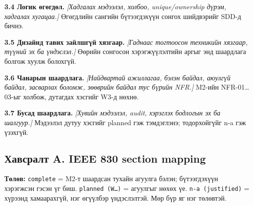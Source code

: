 \textbf{3.4 Логик өгөгдөл.} \emph{{[}Хадгалах мэдээлэл, холбоо,
unique/ownership дүрэм, хадгалах хугацаа.{]}} Өгөгдлийн сангийн
бүтээгдэхүүн сонгох шийдвэрийг SDD-д бичнэ.

\textbf{3.5 Дизайнд тавих зайлшгүй хязгаар.} \emph{{[}Гаднаас тогтоосон
техникийн хязгаар, түүний эх ба үндэслэл.{]}} Өөрийн сонгосон
хэрэгжүүлэлтийн аргыг энд шаардлага болгож хуулж болохгүй.

\textbf{3.6 Чанарын шаардлага.} \emph{{[}Найдвартай ажиллагаа, бэлэн
байдал, аюулгүй байдал, засварлах боломж, зөөврийн байдал тус бүрийн
NFR.{]}} M2-ийн NFR-01\ldots03-ыг холбож, дутагдах хэсгийг W3-д нөхнө.

\textbf{3.7 Бусад шаардлага.} \emph{{[}Хувийн мэдээлэл, audit, хэрэглэх
бодлогын эх ба шалгуур.{]}} Мэдээлэл дутуу хэсгийг planned гэж
тэмдэглэнэ; тодорхойгүйг n-a гэж үзэхгүй.

\subsection{Хавсралт A. IEEE 830 section
mapping}\label{doc3-ux445ux430ux432ux441ux440ux430ux43bux442-a.-ieee-830-section-mapping}

\textbf{Төлөв:} \nolinkurl{complete} = M2-т шаардсан тухайн агуулга
бэлэн; бүтээгдэхүүн хэрэгжсэн гэсэн үг биш. \nolinkurl{planned (W…)} =
агуулгыг нөхөх үе. \nolinkurl{n-a (justified)} = хүрээнд хамаарахгүй,
нэг өгүүлбэр үндэслэлтэй. Мөр бүр яг нэг төлөвтэй.

